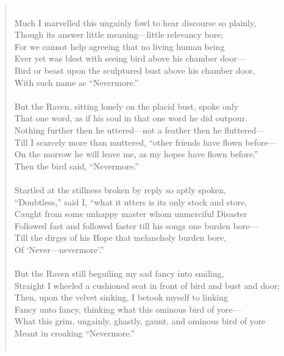 \documentclass[12pt, a4paper]{article}
\begin{document}
\begin{quote}
{\\
Much I marvelled this ungainly fowl to hear discourse so plainly, \\
Though its answer little meaning—little relevancy bore; \\
For we cannot help agreeing that no living human being \\
Ever yet was blest with seeing bird above his chamber door— \\
Bird or beast upon the sculptured bust above his chamber door, \\
With such name as “Nevermore.” \\
\\
But the Raven, sitting lonely on the placid bust, spoke only \\
That one word, as if his soul in that one word he did outpour. \\
Nothing further then he uttered—not a feather then he fluttered— \\
Till I scarcely more than muttered, “other friends have flown before— \\
On the morrow he will leave me, as my hopes have flown before.” \\
Then the bird said, “Nevermore.” \\
\\
Startled at the stillness broken by reply so aptly spoken, \\
“Doubtless,” said I, “what it utters is its only stock and store, \\
Caught from some unhappy master whom unmerciful Disaster \\
Followed fast and followed faster till his songs one burden bore— \\
Till the dirges of his Hope that melancholy burden bore, \\
Of ‘Never—nevermore’.” \\
\\
But the Raven still beguiling my sad fancy into smiling, \\
Straight I wheeled a cushioned seat in front of bird and bust and door; \\
Then, upon the velvet sinking, I betook myself to linking \\
Fancy unto fancy, thinking what this ominous bird of yore— \\
What this grim, ungainly, ghastly, gaunt, and ominous bird of yore \\
Meant in croaking “Nevermore.” \\
\\
}
\end{quote}
\end{document}
